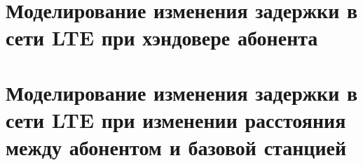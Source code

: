 \appendix
\chapter{Моделирование изменения задержки в сети LTE при хэндовере абонента} \label{AppendixA}

%

\clearpage

\chapter{Моделирование изменения задержки в сети LTE при изменении расстояния между абонентом и базовой станцией} \label{AppendixB}

\clearpage


